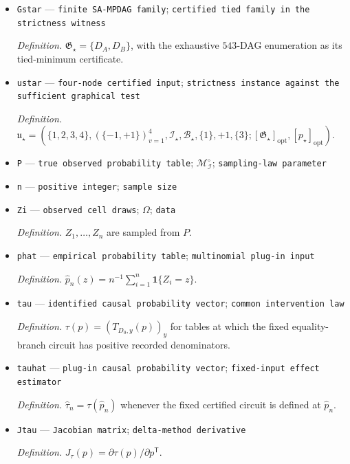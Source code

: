 \documentclass{article}
\begin{document}
\begin{itemize}
  \item \texttt{Gstar} --- \texttt{finite SA-\allowbreak{}MPDAG family}; \texttt{certified tied family in the strictness witness}
  \par\smallskip\noindent\emph{Definition.} \(\mathfrak G_{\star}=\{D_A,D_B\}\), with the exhaustive \(543\)-DAG enumeration as its tied-minimum certificate.
  \item \texttt{ustar} --- \texttt{four-\allowbreak{}node certified input}; \texttt{strictness instance against the sufficient graphical test}
  \par\smallskip\noindent\emph{Definition.} \(\mathfrak u_{\star}=(\{1,2,3,4\},(\{-1,+1\})_{v=1}^4,\mathcal I_{\star},\mathcal B_{\star},\{1\},+1,\{3\};[\mathfrak G_{\star}]_{\mathrm{opt}},[p_{\star}]_{\mathrm{opt}})\).
  \item \texttt{P} --- \texttt{true observed probability table}; \(\mathcal M_{\mathcal I}^{\circ}\); \texttt{sampling-\allowbreak{}law parameter}
  \item \texttt{n} --- \texttt{positive integer}; \texttt{sample size}
  \item \texttt{Zi} --- \texttt{observed cell draws}; \(\Omega\); \texttt{data}
  \par\smallskip\noindent\emph{Definition.} \(Z_1,\ldots,Z_n\) are sampled from \(P\).
  \item \texttt{phat} --- \texttt{empirical probability table}; \texttt{multinomial plug-\allowbreak{}in input}
  \par\smallskip\noindent\emph{Definition.} \(\widehat p_n(z)=n^{-1}\sum_{i=1}^n\mathbf 1\{Z_i=z\}\).
  \item \texttt{tau} --- \texttt{identified causal probability vector}; \texttt{common intervention law}
  \par\smallskip\noindent\emph{Definition.} \(\tau(p)=(T_{D_0,y}(p))_y\) for tables at which the fixed equality-branch circuit has positive recorded denominators.
  \item \texttt{tauhat} --- \texttt{plug-\allowbreak{}in causal probability vector}; \texttt{fixed-\allowbreak{}input effect estimator}
  \par\smallskip\noindent\emph{Definition.} \(\widehat\tau_n=\tau(\widehat p_n)\) whenever the fixed certified circuit is defined at \(\widehat p_n\).
  \item \texttt{Jtau} --- \texttt{Jacobian matrix}; \texttt{delta-\allowbreak{}method derivative}
  \par\smallskip\noindent\emph{Definition.} \(J_{\tau}(p)=\partial\tau(p)/\partial p^{\mathsf T}\).

\end{itemize}
\end{document}
